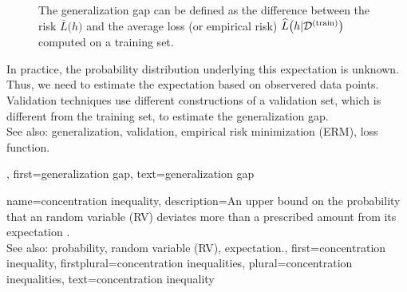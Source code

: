 {{{\begin{figure}[H]
\begin{center}
	\end{center}
	\caption{The generalization gap can be defined as 
	the difference between the 
	risk $\bar{L} \big( h \big) $ and the average loss (or empirical risk) 
	$\widehat{L}\big(h|\mathcal{D}^{(\rm train)}\big)$ computed on a training set.}
\end{figure}
	  In practice, the probability distribution underlying this expectation is 
	  unknown. Thus, we need to estimate the expectation based on 
	  observered data points. Validation techniques 
	  use different constructions of a validation set, which is different from 
	  the training set, to estimate the generalization gap.
		\\
		See also: generalization, validation, empirical risk minimization (ERM), loss function.}, 
	first={generalization gap}, 
	text={generalization gap}
} 
	
{name={concentration inequality}, 
	description={An upper bound on the probability that an random variable (RV) deviates 
		more than a prescribed amount from its expectation \cite{Wain2019}. 
		\\
		See also: probability, random variable (RV), expectation.}, 
	first={concentration inequality},
	firstplural={concentration inequalities},
	plural={concentration inequalities},  
	text={concentration inequality}
}


}
